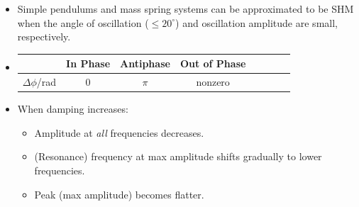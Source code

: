 \documentclass[oneside]{book}
\begin{document}
\begin{itemize}[label=\(\square\)]
\begin{tabular}{|Sc|Sc|Sc|Sc|}
        \(\begin{aligned}
            \frac{1}{2}m\omega^2(x_0^2-x^2)
        \end{aligned}\)&
        \(\begin{aligned}
            \frac{1}{2}m\omega^2x^2
        \end{aligned}\)&
        \(\begin{aligned}
            \frac{1}{2}m\omega^2x_0^2
        \end{aligned}\)\\
        \hline
    \end{tabular}
    \item Simple pendulums and mass spring systems can be approximated to be SHM when the angle of oscillation (\(\leq 20^\circ\)) and oscillation amplitude are small, respectively.
    \item \begin{tabular}{|Sc|Sc|Sc|Sc|}
        \hline
        & In Phase & Antiphase & Out of Phase\\
        \hline
        \(\Delta \phi\)/rad & 0 & \(\pi\) & nonzero
        \\
        \hline
    \end{tabular}
    \item When damping increases:
    \begin{itemize}[label=\(\circ\)]
        \item Amplitude at \emph{all} frequencies decreases.
        \item (Resonance) frequency at max amplitude shifts gradually to lower frequencies.
        \item Peak (max amplitude) becomes flatter.
    \end{itemize}
\end{itemize}
\end{document}

